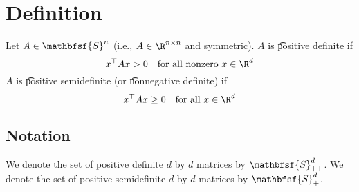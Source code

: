 


\section*{Definition}

Let $A \in \mathbfsf{S} ^n$ (i.e., $A \in \R ^{n \times  n}$ and symmetric).
$A$ is \t{positive definite} if
\[
x^\top  A x > 0 \quad \text{for all nonzero } x \in \R ^d
\]
$A$ is \t{positive semidefinite} (or \t{nonnegative definite}) if
\[
x^\top  A x \geq 0 \quad \text{for all } x \in \R ^d
\]

\subsection*{Notation}

We denote the set of positive definite $d$ by $d$ matrices by $\mathbfsf{S} _{++}^d$.
We denote the set of positive semidefinite $d$ by $d$ matrices by $\mathbfsf{S} _{+}^d$.

\blankpage